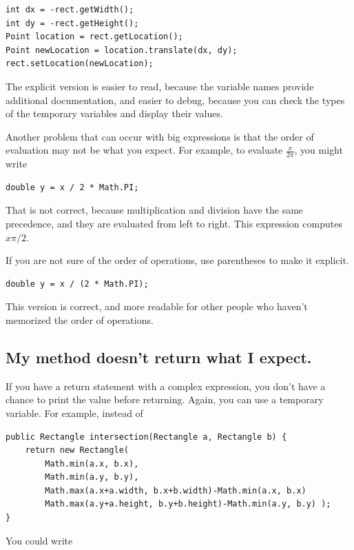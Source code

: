 \documentclass[12pt]{book}
\theoremstyle{exercise}
\begin{document}
\begin{lstlisting}
int dx = -rect.getWidth();
int dy = -rect.getHeight();
Point location = rect.getLocation();
Point newLocation = location.translate(dx, dy);
rect.setLocation(newLocation);
\end{lstlisting}
%
The explicit version is easier to read, because the variable
names provide additional documentation, and easier to debug,
because you can check the types of the temporary variables
and display their values.


Another problem that can occur with big expressions is
that the order of evaluation may not be what you expect.
For example, to evaluate
$\frac{x}{2 \pi}$, you might write

\begin{lstlisting}
double y = x / 2 * Math.PI;
\end{lstlisting}
%
That is not correct, because multiplication and division have
the same precedence, and they are evaluated from left to right.
This expression computes $x \pi / 2$.

If you are not sure of the order of operations, use parentheses to
make it explicit.

\begin{lstlisting}
double y = x / (2 * Math.PI);
\end{lstlisting}
%
This version is correct,
and more readable for
other people who haven't memorized the order of operations.



\subsection*{My method doesn't return what I expect.}

If you have a return statement with a complex expression,
you don't have a chance to print the value before
returning.  Again, you can use a temporary variable.  For
example, instead of

\begin{lstlisting}
public Rectangle intersection(Rectangle a, Rectangle b) {
    return new Rectangle(
        Math.min(a.x, b.x),
        Math.min(a.y, b.y),
        Math.max(a.x+a.width, b.x+b.width)-Math.min(a.x, b.x)
        Math.max(a.y+a.height, b.y+b.height)-Math.min(a.y, b.y) );
}
\end{lstlisting}
%
You could write
\end{document}
